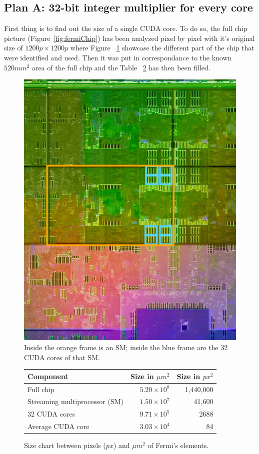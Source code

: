 \documentclass{report}
\begin{document}
   \subsection{Plan A: 32-bit integer multiplier for every core}
   First thing is to find out the size of a single CUDA core. To do so, the full chip picture (Figure~\ref{fig:fermiChip}) has been analyzed pixel by pixel with it's original size of $1200p \times 1200p$ where Figure ~\ref{fig:fermiChipWithLeg} showcase the different part of the chip that were identified and used. Then it was put 
   in correspondance to the known $520mm^2$ area of the full chip and the Table ~\ref{tab:sizeChart} has then been filled.
   \begin{figure}[H]
    \centering
        \includegraphics[width=0.7\linewidth]{pictures/FermiChipWithLegend}
        \captionsetup{justification=centering}
        \caption{Inside the orange frame is an SM; inside the blue frame are the 32 CUDA cores of that SM.}
        \label{fig:fermiChipWithLeg}
    \end{figure}
   \begin{figure}[H]
    \centering
        \begin{tabular}{ | l | r | r | }
    	    \hline
    	    Component & Size in $\mu m^2$ & Size in $px^2$ \\ \hline
    	    Full chip &  $5.20 \times 10^8$ & 1,440,000 \\
            Streaming multiprocessor (SM) & $1.50 \times 10^7$ & 41,600 \\
            32 CUDA cores & $9.71 \times 10^5$ & 2688 \\
            Average CUDA core & $3.03 \times 10^4$ &  84 \\ \hline
  	    \end{tabular}
  	\captionsetup{justification=centering}
  	\caption{Size chart between pixels ($px$) and $\mu m^2$ of Fermi's elements.}
  	\label{tab:sizeChart}
    \end{figure}
    
\end{document}
